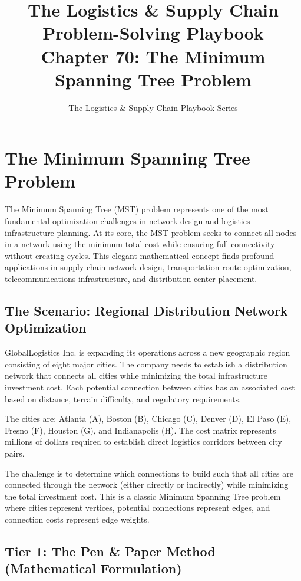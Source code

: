 \documentclass{article}
\title{The Logistics \& Supply Chain Problem-Solving Playbook\\Chapter 70: The Minimum Spanning Tree Problem}
\author{The Logistics \& Supply Chain Playbook Series}
\date{}
\begin{document}
\maketitle

\section{The Minimum Spanning Tree Problem}

The Minimum Spanning Tree (MST) problem represents one of the most fundamental optimization challenges in network design and logistics infrastructure planning. At its core, the MST problem seeks to connect all nodes in a network using the minimum total cost while ensuring full connectivity without creating cycles. This elegant mathematical concept finds profound applications in supply chain network design, transportation route optimization, telecommunications infrastructure, and distribution center placement.

\subsection{The Scenario: Regional Distribution Network Optimization}

GlobalLogistics Inc. is expanding its operations across a new geographic region consisting of eight major cities. The company needs to establish a distribution network that connects all cities while minimizing the total infrastructure investment cost. Each potential connection between cities has an associated cost based on distance, terrain difficulty, and regulatory requirements.

The cities are: Atlanta (A), Boston (B), Chicago (C), Denver (D), El Paso (E), Fresno (F), Houston (G), and Indianapolis (H). The cost matrix represents millions of dollars required to establish direct logistics corridors between city pairs.

The challenge is to determine which connections to build such that all cities are connected through the network (either directly or indirectly) while minimizing the total investment cost. This is a classic Minimum Spanning Tree problem where cities represent vertices, potential connections represent edges, and connection costs represent edge weights.

\subsection{Tier 1: The Pen \& Paper Method (Mathematical Formulation)}
\end{document}
